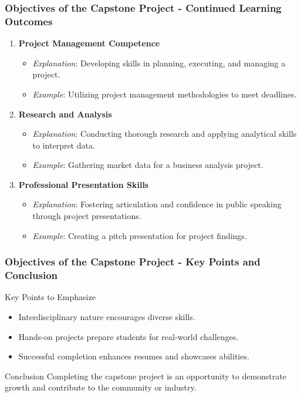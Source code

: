 \documentclass[aspectratio=169]{beamer}
\begin{document}
\begin{frame}[fragile]
    \frametitle{Objectives of the Capstone Project - Continued Learning Outcomes}
    \begin{enumerate}[start=4]
        \item \textbf{Project Management Competence}
            \begin{itemize}
                \item \textit{Explanation}: Developing skills in planning, executing, and managing a project.
                \item \textit{Example}: Utilizing project management methodologies to meet deadlines.
            \end{itemize}

        \item \textbf{Research and Analysis}
            \begin{itemize}
                \item \textit{Explanation}: Conducting thorough research and applying analytical skills to interpret data.
                \item \textit{Example}: Gathering market data for a business analysis project.
            \end{itemize}

        \item \textbf{Professional Presentation Skills}
            \begin{itemize}
                \item \textit{Explanation}: Fostering articulation and confidence in public speaking through project presentations.
                \item \textit{Example}: Creating a pitch presentation for project findings.
            \end{itemize}
    \end{enumerate}
\end{frame}

\begin{frame}[fragile]
    \frametitle{Objectives of the Capstone Project - Key Points and Conclusion}
    \begin{block}{Key Points to Emphasize}
        \begin{itemize}
            \item Interdisciplinary nature encourages diverse skills.
            \item Hands-on projects prepare students for real-world challenges.
            \item Successful completion enhances resumes and showcases abilities.
        \end{itemize}
    \end{block}

    \begin{block}{Conclusion}
        Completing the capstone project is an opportunity to demonstrate growth and contribute to the community or industry.
    \end{block}
\end{frame}
\end{document}
